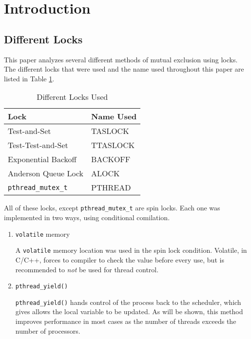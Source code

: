 \section{Introduction}

\subsection{Different Locks}

This paper analyzes several different methods of mutual exclusion using locks.
The different locks that were used and the name used throughout this paper are listed in Table \ref{table:locks}.

\begin{table}[hp]
    \caption{Different Locks Used}
    \begin{center}
        \begin{tabular}{|l|l|}
            \hline Lock & Name Used \\
            \hline Test-and-Set & TASLOCK \\
            \hline Test-Test-and-Set & TTASLOCK \\
            \hline Exponential Backoff & BACKOFF \\
            \hline Anderson Queue Lock & ALOCK \\
            \hline \verb+pthread_mutex_t+ & PTHREAD \\
            \hline
        \end{tabular}
    \end{center}
    \label{table:locks}
\end{table}

All of these locks, except \verb+pthread_mutex_t+ are spin locks.
Each one was implemented in two ways, using conditional comilation.
\begin{enumerate}
    \item \verb+volatile+ memory

        A \verb+volatile+ memory location was used in the spin lock condition.
        Volatile, in C/C++, forces to compiler to check the value before every use, but is recommended to \emph{not} be used for thread control.
    \item \verb+pthread_yield()+

        \verb+pthread_yield()+ hands control of the process back to the scheduler, which gives allows the local variable to be updated.
        As will be shown, this method improves performance in most cases as the number of threads exceeds the number of processors.
\end{enumerate}


